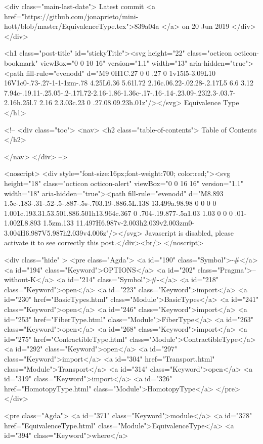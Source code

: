     <div class="main-last-date">
      Latest commit <a href="https://github.com/jonaprieto/mini-hott/blob/master/EquivalenceType.tex">839a04a </a> on  20 Jun 2019
    </div>
  </div>
  
  <h1 class="post-title" id="stickyTitle"><svg height="22" class="octicon octicon-bookmark" viewBox="0 0 10 16" version="1.1" width="13" aria-hidden="true"><path fill-rule="evenodd" d="M9 0H1C.27 0 0 .27 0 1v15l5-3.09L10 16V1c0-.73-.27-1-1-1zm-.78 4.25L6.36 5.61l.72 2.16c.06.22-.02.28-.2.17L5 6.6 3.12 7.94c-.19.11-.25.05-.2-.17l.72-2.16-1.86-1.36c-.17-.16-.14-.23.09-.23l2.3-.03.7-2.16h.25l.7 2.16 2.3.03c.23 0 .27.08.09.23h.01z"/></svg> Equivalence Type
  </h1>

  <!-- 
  <div class="toc">
    <nav>
    <h2 class="table-of-contents"> Table of Contents </h2>
      

    </nav>
  </div>
   -->

  <noscript>
  <div style="font-size:16px;font-weight:700; color:red;"><svg height="18" class="octicon octicon-alert" viewBox="0 0 16 16" version="1.1" width="18" aria-hidden="true"><path fill-rule="evenodd" d="M8.893 1.5c-.183-.31-.52-.5-.887-.5s-.703.19-.886.5L.138 13.499a.98.98 0 0 0 0 1.001c.193.31.53.501.886.501h13.964c.367 0 .704-.19.877-.5a1.03 1.03 0 0 0 .01-1.002L8.893 1.5zm.133 11.497H6.987v-2.003h2.039v2.003zm0-3.004H6.987V5.987h2.039v4.006z"/></svg> Javascript is disabled, please activate it to see correctly this post.</div><br/>
  </noscript>

  <div class="hide" >
<pre class="Agda">
<a id="190" class="Symbol">{-#</a> <a id="194" class="Keyword">OPTIONS</a> <a id="202" class="Pragma">--without-K</a> <a id="214" class="Symbol">#-}</a>
<a id="218" class="Keyword">open</a> <a id="223" class="Keyword">import</a> <a id="230" href="BasicTypes.html" class="Module">BasicTypes</a>
<a id="241" class="Keyword">open</a> <a id="246" class="Keyword">import</a> <a id="253" href="FiberType.html" class="Module">FiberType</a>
<a id="263" class="Keyword">open</a> <a id="268" class="Keyword">import</a> <a id="275" href="ContractibleType.html" class="Module">ContractibleType</a>
<a id="292" class="Keyword">open</a> <a id="297" class="Keyword">import</a> <a id="304" href="Transport.html" class="Module">Transport</a>
<a id="314" class="Keyword">open</a> <a id="319" class="Keyword">import</a> <a id="326" href="HomotopyType.html" class="Module">HomotopyType</a>
</pre>
</div>

<pre class="Agda">
<a id="371" class="Keyword">module</a> <a id="378" href="EquivalenceType.html" class="Module">EquivalenceType</a> <a id="394" class="Keyword">where</a>

